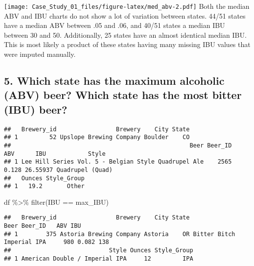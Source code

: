 \documentclass[
]{article}
\newenvironment{Shaded}{\begin{snugshade}}{\end{snugshade}}
\newcommand{\CommentTok}[1]{\textcolor[rgb]{0.56,0.35,0.01}{\textit{#1}}}
\newcommand{\FunctionTok}[1]{\textcolor[rgb]{0.00,0.00,0.00}{#1}}
\newcommand{\NormalTok}[1]{#1}
\newcommand{\OtherTok}[1]{\textcolor[rgb]{0.56,0.35,0.01}{#1}}
\newcommand{\SpecialCharTok}[1]{\textcolor[rgb]{0.00,0.00,0.00}{#1}}
\begin{document}
\texttt{[image: Case\_Study\_01\_files/figure-latex/med\_abv-2.pdf]} Both
the median ABV and IBU charts do not show a lot of variation between
states. 44/51 states have a median ABV between .05 and .06, and 40/51
states a median IBU between 30 and 50. Additionally, 25 states have an
almost identical median IBU. This is most likely a product of these
states having many missing IBU values that were imputed manually.

\hypertarget{which-state-has-the-maximum-alcoholic-abv-beer-which-state-has-the-most-bitter-ibu-beer}{%
\subsection{5. Which state has the maximum alcoholic (ABV) beer? Which
state has the most bitter (IBU)
beer?}\label{which-state-has-the-maximum-alcoholic-abv-beer-which-state-has-the-most-bitter-ibu-beer}}

\begin{Shaded}
\end{Shaded}

\begin{verbatim}
##   Brewery_id                 Brewery    City State
## 1         52 Upslope Brewing Company Boulder    CO
##                                                   Beer Beer_ID   ABV      IBU            Style
## 1 Lee Hill Series Vol. 5 - Belgian Style Quadrupel Ale    2565 0.128 26.55937 Quadrupel (Quad)
##   Ounces Style_Group
## 1   19.2       Other
\end{verbatim}

\begin{Shaded}
\begin{Highlighting}[]
\NormalTok{df }\SpecialCharTok{\%\textgreater{}\%} \FunctionTok{filter}\NormalTok{(IBU }\SpecialCharTok{==}\NormalTok{ max\_IBU)}
\end{Highlighting}
\end{Shaded}

\begin{verbatim}
##   Brewery_id                 Brewery    City State                      Beer Beer_ID   ABV IBU
## 1        375 Astoria Brewing Company Astoria    OR Bitter Bitch Imperial IPA     980 0.082 138
##                            Style Ounces Style_Group
## 1 American Double / Imperial IPA     12         IPA
\end{verbatim}
\end{document}
